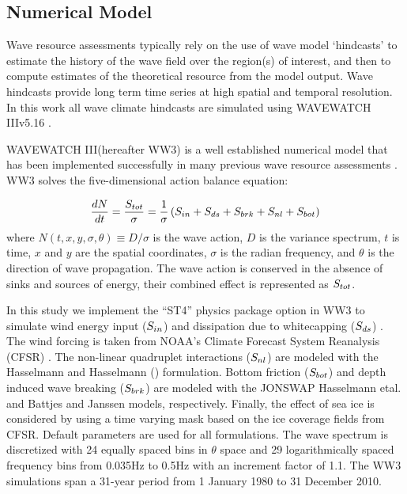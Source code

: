 
\subsection{Numerical Model} \label{sec:method:model}


Wave resource assessments typically rely on the use of wave model `hindcasts' to estimate the history of the wave field over the region(s) of interest, and then to compute estimates of the theoretical resource from the model output. Wave hindcasts provide long term time series at high spatial and temporal resolution. In this work all wave climate hindcasts are simulated using WAVEWATCH III\textregistered v5.16 \citep{tolmanDistributedmemoryConceptsWave2002,tolmanwavewatch}.

WAVEWATCH III\textregistered (hereafter WW3) is a  well established numerical model that has been implemented successfully in many previous wave resource assessments \citep[e.g.,][]{garcia-medinaWaveResourceAssessment2014,hemerRevisedAssessmentAustralia2017,yangWaveModelTest2017}.
WW3 solves the five-dimensional action balance equation:

\begin{align}
  \frac{d N}{d t} = \frac{S_{ tot }}{\sigma} = \frac{1}{\sigma}\left ( S_{ in } + S_{ ds } + S_{ brk } + S_{ nl } + S_{ bot } \right )
  \label{eqn:actionbalance}
\end{align}
where $N(t,x,y,\sigma,\theta) \equiv D/\sigma$ is the wave action, $D$ is the variance spectrum, $t$ is time, $x$ and $y$ are the spatial coordinates, $\sigma$ is the radian frequency, and $\theta$ is the direction of wave propagation.
The wave action is conserved in the absence of sinks and sources of energy, their combined effect is represented as $S_{ tot }$.

In this study we implement the ``ST4'' physics package option in WW3 to simulate wind energy input ($S_{ in }$) and dissipation due to whitecapping ($S_{ ds }$) \citep{ardhuinObservationSwellDissipation2009}.
The wind forcing is taken from NOAA's Climate Forecast System Reanalysis (CFSR) \citep{sahaNCEPClimateForecast2010}. The non-linear quadruplet interactions ($S_{ nl }$) are modeled with the Hasselmann and Hasselmann (\citeyear{hasselmannComputationsParameterizationsNonlinear1985}) formulation. Bottom friction ($S_{ bot }$) and depth induced wave breaking ($S_{ brk }$) are modeled with the JONSWAP Hasselmann etal. \citeyear{hasselmannMeasurementsWindwaveGrowth1973} and Battjes and Janssen \citeyear{battjesEnergyLossSetup1978} models, respectively. Finally, the effect of sea ice is considered by using a time varying mask based on the ice coverage fields from CFSR. Default parameters are used for all formulations. The wave spectrum is discretized with 24 equally spaced bins in $\theta$ space and 29 logarithmically spaced frequency bins from 0.035Hz to 0.5Hz with an increment factor of 1.1. The WW3 simulations span a 31-year period from 1 January 1980 to 31 December 2010.

